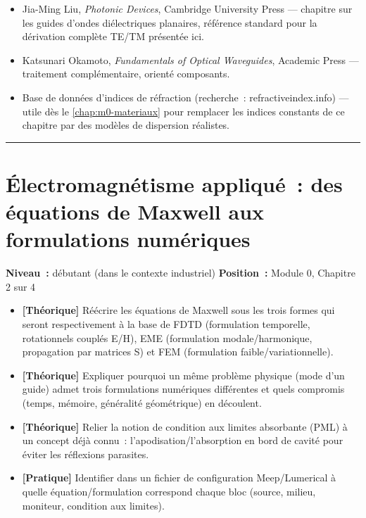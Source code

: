 \begin{ressources}
\begin{itemize}[leftmargin=1.4em]
  \item Jia-Ming Liu, \emph{Photonic Devices}, Cambridge University Press —
    chapitre sur les guides d'ondes diélectriques planaires, référence
    standard pour la dérivation complète TE/TM présentée ici.
  \item Katsunari Okamoto, \emph{Fundamentals of Optical Waveguides},
    Academic Press — traitement complémentaire, orienté composants.
  \item Base de données d'indices de réfraction (recherche~: \og
    refractiveindex.info\fg{}) — utile dès le \cref{chap:m0-materiaux}
    pour remplacer les indices constants de ce chapitre par des modèles de
    dispersion réalistes.
\end{itemize}
\end{ressources}

\bigskip
\hrule
\bigskip

\chapter{Électromagnétisme appliqué~: des équations de Maxwell aux formulations numériques}
\label{chap:m0-em}

\noindent\textbf{Niveau~:} débutant (dans le contexte industriel) \hfill
\textbf{Position~:} Module 0, Chapitre 2 sur 4

\begin{objectifs}
\begin{itemize}[leftmargin=1.4em]
  \item \textbf{[Théorique]} Réécrire les équations de Maxwell sous les trois formes qui seront respectivement à la base de FDTD (formulation temporelle, rotationnels couplés E/H), EME (formulation modale/harmonique, propagation par matrices S) et FEM (formulation faible/variationnelle).
  \item \textbf{[Théorique]} Expliquer pourquoi un même problème physique (mode d'un guide) admet trois formulations numériques différentes et quels compromis (temps, mémoire, généralité géométrique) en découlent.
  \item \textbf{[Théorique]} Relier la notion de condition aux limites absorbante (PML) à un concept déjà connu~: l'apodisation/l'absorption en bord de cavité pour éviter les réflexions parasites.
  \item \textbf{[Pratique]} Identifier dans un fichier de configuration Meep/Lumerical à quelle équation/formulation correspond chaque bloc (source, milieu, moniteur, condition aux limites).
\end{itemize}
\end{objectifs}

